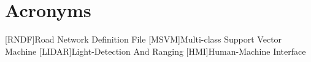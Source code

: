 
\cleardoublepage
\chapter*{Acronyms}\label{ch:acronyms}
\begin{acronym}[acronyms]
\end{acronym}

[RNDF]{Road Network Definition File}
[MSVM]{Multi-class Support Vector Machine}
[LIDAR]{Light-Detection And Ranging}
[HMI]{Human-Machine Interface}

